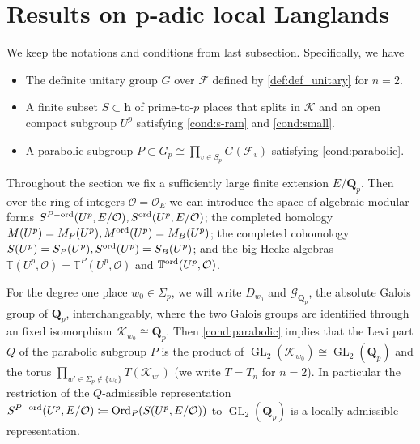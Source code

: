 \documentclass[leqno]{amsart}
\theoremstyle{definition}
\theoremstyle{remark}
\newcommand{\oo}{\mathcal{O}}
\newcommand{\Qp}{\mathbf{Q}_p}
\newcommand{\finite}{\mathbf{h}}
\DeclareMathOperator{\GL}{GL}
\DeclareMathOperator{\Ord}{Ord} %
\newcommand{\Gp}{\mathcal{G}_{\Qp}} %
\newcommand{\F}{{\mathcal{F}}} %
\newcommand{\K}{{\mathcal{K}}} %
\newcommand{\TT}{\mathbb{T}} %
\newcommand{\ord}{\textnormal{ord}} %
\begin{document}
\section{Results on p-adic local Langlands}

We keep the notations and conditions from last subsection.
Specifically, we have
\begin{itemize}
\item The definite unitary group $G$ over $\F$
defined by \eqref{def:def_unitary} for $n=2$.
\item A finite subset $S\subset\finite$ of prime-to-$p$
places that splits in $\K$
and an open compact subgroup $U^p$
satisfying \eqref{cond:s-ram} and \eqref{cond:small}.
\item A parabolic subgroup $P\subset G_p\cong\prod_{v\in S_p}G(\F_v)$
satisfying \eqref{cond:parabolic}.
\end{itemize}
Throughout the section
we fix a sufficiently large finite extension $E/\Qp$.
Then over the ring of integers $\oo=\oo_E$ 
we can introduce the space of 
algebraic modular forms 
$S^{P-\ord}(U^p,E/\oo), S^{\ord}(U^p,E/\oo)$;
the completed homology
$M(U^p)=M_P(U^p), M^{\ord}(U^p)=M_B(U^p)$; 
the completed cohomology
$S(U^p)=S_P(U^p), S^{\ord}(U^p)=S_B(U^p)$;
and the big Hecke algebras
$\TT(U^p,\oo)=\TT^P(U^p,\oo)$ and $\TT^{\ord}(U^p,\oo)$.

For the degree one place $w_0\in \Sigma_p$,
we will write $D_{w_0}$ and $\Gp$,
the absolute Galois group of  $\Qp$, interchangeably,
where the two Galois groups are identified 
through an fixed isomorphism $\K_{w_0}\cong \Qp$.
Then \eqref{cond:parabolic}
implies that the Levi part $Q$
of the parabolic subgroup $P$
is the product of $\GL_2(\K_{w_0})\cong \GL_2(\Qp)$
and the torus $\prod_{w'\in\Sigma_p\notin\{w_0\}}T(\K_{w'})$
(we write $T=T_n$ for $n=2$).
In particular the restriction of the $Q$-admissible representation
$S^{P-\ord}(U^p,E/\oo)\coloneqq \Ord_P(S(U^p,E/\oo))$
to $\GL_2(\Qp)$
is a locally admissible representation.
\end{document}
